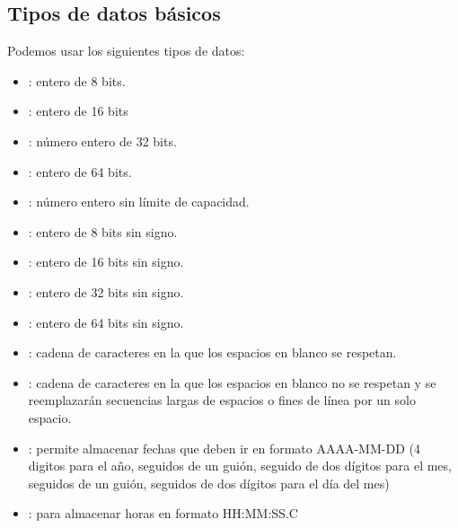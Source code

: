 \documentclass[letterpaper,10pt,spanish]{sphinxmanual}
\begin{document}
\subsection{Tipos de datos básicos}
\label{\detokenize{tema5:tipos-de-datos-basicos}}
Podemos usar los siguientes tipos de datos:
\begin{itemize}
\item {} 
: entero de 8 bits.

\item {} 
: entero de 16 bits

\item {} 
: número entero de 32 bits.

\item {} 
: entero de 64 bits.

\item {} 
: número entero sin límite de capacidad.

\item {} 
: entero de 8 bits sin signo.

\item {} 
: entero de 16 bits sin signo.

\item {} 
: entero de 32 bits sin signo.

\item {} 
: entero de 64 bits sin signo.

\item {} 
: cadena de caracteres en la que los espacios en blanco se respetan.

\item {} 
: cadena de caracteres en la que los espacios en blanco no se respetan y se reemplazarán secuencias largas de espacios o fines de línea por un solo espacio.

\item {} 
: permite almacenar fechas que deben ir  en formato AAAA-MM-DD (4 digitos para el año, seguidos de un guión, seguido de dos dígitos para el mes, seguidos de un guión, seguidos de dos dígitos para el día del mes)

\item {} 
: para almacenar horas en formato HH:MM:SS.C


\end{itemize}
\end{document}

